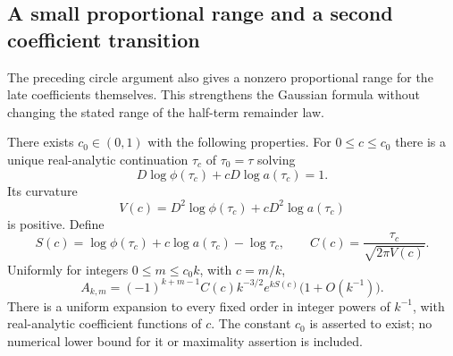 \subsection{A small proportional range and a second coefficient transition}
\label{moderate:sec:proportional}

The preceding circle argument also gives a nonzero proportional range
for the late coefficients themselves. This strengthens the Gaussian
formula without changing the stated range of the half-term remainder
law.

\begin{theorem}
\label{moderate:thm:proportional}
There exists $c_0\in(0,1)$ with the following properties. For
$0\le c\le c_0$ there is a unique real-analytic continuation
$\tau_c$ of $\tau_0=\tau$ solving
\begin{equation}\label{moderate:eq:moving-saddle}
 D\log\phi(\tau_c)+cD\log a(\tau_c)=1.
\end{equation}
Its curvature
\[
 V(c)=D^2\log\phi(\tau_c)+cD^2\log a(\tau_c)
\]
is positive. Define
\begin{equation}\label{moderate:eq:rate-prefactor}
 S(c)=\log\phi(\tau_c)+c\log a(\tau_c)-\log\tau_c,
 \qquad C(c)=\frac{\tau_c}{\sqrt{2\pi V(c)}}.
\end{equation}
Uniformly for integers $0\le m\le c_0 k$, with $c=m/k$,
\begin{equation}\label{moderate:eq:proportional}
 A_{k,m}=(-1)^{k+m-1}C(c)k^{-3/2}e^{kS(c)}
                         \bigl(1+O(k^{-1})\bigr).
\end{equation}
There is a uniform expansion to every fixed order in integer powers of
$k^{-1}$, with real-analytic coefficient functions of $c$.
The constant $c_0$ is asserted to exist; no numerical lower bound for it
or maximality assertion is included.
\end{theorem}

